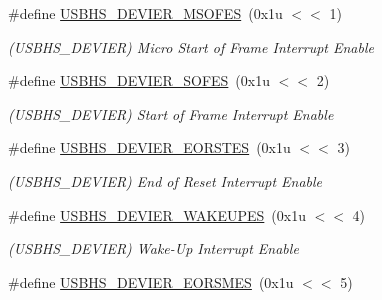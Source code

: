 \begin{DoxyCompactItemize}
\mbox{\label{group__SAMS70__USBHS_ga225a9e428f65224fb3d621a95dcd4b83}} 
\#define \mbox{\hyperlink{group__SAMS70__USBHS_ga225a9e428f65224fb3d621a95dcd4b83}{U\+S\+B\+H\+S\+\_\+\+D\+E\+V\+I\+E\+R\+\_\+\+M\+S\+O\+F\+ES}}~(0x1u $<$$<$ 1)
\begin{DoxyCompactList}\small\item\em (U\+S\+B\+H\+S\+\_\+\+D\+E\+V\+I\+ER) Micro Start of Frame Interrupt Enable \end{DoxyCompactList}\item 
\mbox{\label{group__SAMS70__USBHS_ga7de30665df3c266939e6d925de57990a}} 
\#define \mbox{\hyperlink{group__SAMS70__USBHS_ga7de30665df3c266939e6d925de57990a}{U\+S\+B\+H\+S\+\_\+\+D\+E\+V\+I\+E\+R\+\_\+\+S\+O\+F\+ES}}~(0x1u $<$$<$ 2)
\begin{DoxyCompactList}\small\item\em (U\+S\+B\+H\+S\+\_\+\+D\+E\+V\+I\+ER) Start of Frame Interrupt Enable \end{DoxyCompactList}\item 
\mbox{\label{group__SAMS70__USBHS_gafca5592f127b2370fa403d94589ccc00}} 
\#define \mbox{\hyperlink{group__SAMS70__USBHS_gafca5592f127b2370fa403d94589ccc00}{U\+S\+B\+H\+S\+\_\+\+D\+E\+V\+I\+E\+R\+\_\+\+E\+O\+R\+S\+T\+ES}}~(0x1u $<$$<$ 3)
\begin{DoxyCompactList}\small\item\em (U\+S\+B\+H\+S\+\_\+\+D\+E\+V\+I\+ER) End of Reset Interrupt Enable \end{DoxyCompactList}\item 
\mbox{\label{group__SAMS70__USBHS_ga5e2be40cd44f9f28021fe1a0f0474160}} 
\#define \mbox{\hyperlink{group__SAMS70__USBHS_ga5e2be40cd44f9f28021fe1a0f0474160}{U\+S\+B\+H\+S\+\_\+\+D\+E\+V\+I\+E\+R\+\_\+\+W\+A\+K\+E\+U\+P\+ES}}~(0x1u $<$$<$ 4)
\begin{DoxyCompactList}\small\item\em (U\+S\+B\+H\+S\+\_\+\+D\+E\+V\+I\+ER) Wake-\/\+Up Interrupt Enable \end{DoxyCompactList}\item 
\mbox{\label{group__SAMS70__USBHS_gac482d6665434c2b43ebad538db574d17}} 
\#define \mbox{\hyperlink{group__SAMS70__USBHS_gac482d6665434c2b43ebad538db574d17}{U\+S\+B\+H\+S\+\_\+\+D\+E\+V\+I\+E\+R\+\_\+\+E\+O\+R\+S\+M\+ES}}~(0x1u $<$$<$ 5)
$$
\end{DoxyCompactItemize}
